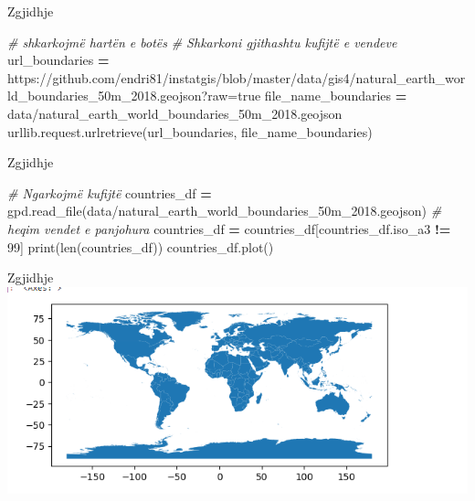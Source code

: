 \documentclass[
  ignorenonframetext,
]{beamer}
\newenvironment{Shaded}{\begin{snugshade}}{\end{snugshade}}
\newcommand{\BuiltInTok}[1]{#1}
\newcommand{\CommentTok}[1]{\textcolor[rgb]{0.56,0.35,0.01}{\textit{#1}}}
\newcommand{\NormalTok}[1]{#1}
\newcommand{\OperatorTok}[1]{\textcolor[rgb]{0.81,0.36,0.00}{\textbf{#1}}}
\newcommand{\StringTok}[1]{\textcolor[rgb]{0.31,0.60,0.02}{#1}}
\begin{document}
\begin{frame}[fragile]{Zgjidhje}
\protect\hypertarget{zgjidhje-5}{}

\begin{Shaded}
\begin{Highlighting}[]
\CommentTok{\# shkarkojmë hartën e botës}
\CommentTok{\# Shkarkoni gjithashtu kufijtë e vendeve}
\NormalTok{url\_boundaries }\OperatorTok{=} \StringTok{\textquotesingle{}https://github.com/endri81/instatgis/blob/master/data/gis4/natural\_earth\_world\_boundaries\_50m\_2018.geojson?raw=true\textquotesingle{}}
\NormalTok{file\_name\_boundaries }\OperatorTok{=} \StringTok{\textquotesingle{}data/natural\_earth\_world\_boundaries\_50m\_2018.geojson\textquotesingle{}}
\NormalTok{urllib.request.urlretrieve(url\_boundaries, file\_name\_boundaries)}
\end{Highlighting}
\end{Shaded}
\end{frame}

\begin{frame}[fragile]{Zgjidhje}
\protect\hypertarget{zgjidhje-6}{}

\begin{Shaded}
\begin{Highlighting}[]
\CommentTok{\# Ngarkojmë kufijtë}
\NormalTok{countries\_df }\OperatorTok{=}\NormalTok{ gpd.read\_file(}\StringTok{\textquotesingle{}data/natural\_earth\_world\_boundaries\_50m\_2018.geojson\textquotesingle{}}\NormalTok{)}
\CommentTok{\# heqim vendet e panjohura}
\NormalTok{countries\_df }\OperatorTok{=}\NormalTok{ countries\_df[countries\_df.iso\_a3 }\OperatorTok{!=} \StringTok{\textquotesingle{}{-}99\textquotesingle{}}\NormalTok{]}
\BuiltInTok{print}\NormalTok{(}\BuiltInTok{len}\NormalTok{(countries\_df))}
\NormalTok{countries\_df.plot()}
\end{Highlighting}
\end{Shaded}
\end{frame}

\begin{frame}{Zgjidhje}
\protect\hypertarget{zgjidhje-7}{}
\includegraphics{./Figs/bota.png}
\end{frame}
\end{document}

